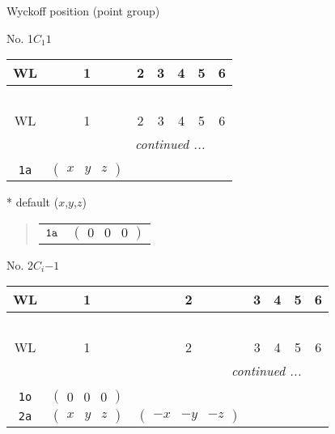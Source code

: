 \documentclass[fleqn,9pt,landscape]{jsarticle}
\begin{document}
\setcounter{MaxMatrixCols}{16}

\begin{center}
\LARGE
Wyckoff position (point group)
\end{center}
No. 1\quad$C_{1}$\quad$1$\quad[ triclinic ]
\begin{center}
\renewcommand{\arraystretch}{1.2}
\begin{longtable}{ccccccc}
 \hline \hline
WL & 1 & 2 & 3 & 4 & 5 & 6 \\ \hline \endfirsthead

\multicolumn{6}{l}{\tablename\ \thetable{}} \\
 \hline \hline
WL & 1 & 2 & 3 & 4 & 5 & 6 \\ \hline \endhead

 \hline \hline
\multicolumn{6}{r}{\footnotesize\it continued ...} \\ \endfoot

 \hline \hline
\multicolumn{6}{r}{} \\ \endlastfoot

{\tt 1a} & $ \begin{pmatrix} x & y & z \end{pmatrix} $ \\
\end{longtable}
\end{center}
* default ($x$,$y$,$z$)
\begin{quote}
\begin{tabular}{cc}
$ {\tt 1a} $ & $ \begin{pmatrix} 0 & 0 & 0 \end{pmatrix} $
\end{tabular}
\end{quote}
\newpage
No. 2\quad$C_{i}$\quad$-1$\quad[ triclinic ]
\begin{center}
\renewcommand{\arraystretch}{1.2}
\begin{longtable}{ccccccc}
 \hline \hline
WL & 1 & 2 & 3 & 4 & 5 & 6 \\ \hline \endfirsthead

\multicolumn{6}{l}{\tablename\ \thetable{}} \\
 \hline \hline
WL & 1 & 2 & 3 & 4 & 5 & 6 \\ \hline \endhead

 \hline \hline
\multicolumn{6}{r}{\footnotesize\it continued ...} \\ \endfoot

 \hline \hline
\multicolumn{6}{r}{} \\ \endlastfoot

{\tt 1o} & $ \begin{pmatrix} 0 & 0 & 0 \end{pmatrix} $ & $  $ \\ \hline
{\tt 2a} & $ \begin{pmatrix} x & y & z \end{pmatrix} $ & $ \begin{pmatrix} - x & - y & - z \end{pmatrix} $ \\
\end{longtable}
\end{center}
\end{document}
